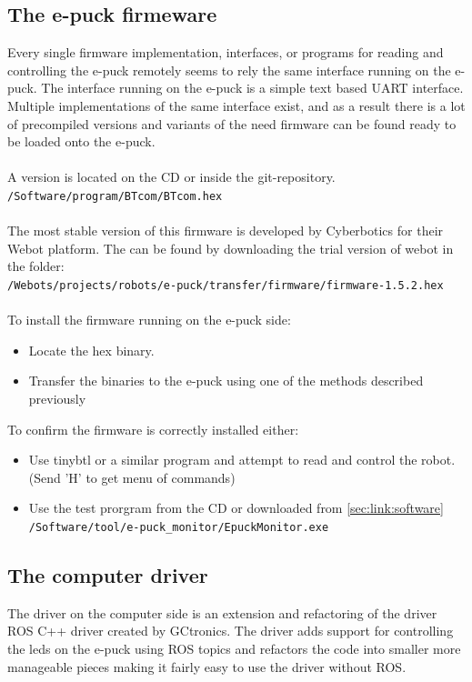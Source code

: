 \documentclass{article}
\newcommand{\stt}[1]{{\small\tt #1}}
\begin{document}
\subsection{The e-puck firmeware}
\label{sec:driver_epuck_side}
Every single firmware implementation, interfaces, or programs for reading and controlling the 
e-puck remotely seems to rely the same interface running on the e-puck.
The interface running on the e-puck is a simple text based UART interface. Multiple implementations of the same interface exist, and as a result there is a lot of precompiled versions and variants of the need firmware can be found ready to be loaded onto the e-puck.
\\
\\A version is located on the CD or inside the git-repository.
\\\stt{/Software/program/BTcom/BTcom.hex}
\\
\\
The most stable version of this firmware is developed by
Cyberbotics for their Webot platform.
The can be found by downloading the trial version of webot in the folder:
\\\stt{/Webots/projects/robots/e-puck/transfer/firmware/firmware-1.5.2.hex}
\\\
\\
\noindent
To install the firmware running on the e-puck side:
\begin{itemize}
\item Locate the hex binary. 
\item Transfer the binaries to the e-puck using one of the methods described previously 
\end{itemize}

\noindent
To confirm the firmware is correctly installed either:
\begin{itemize}
\item Use tinybtl or a similar program and attempt to read and control the robot. (Send 'H' to get menu of commands)
\item Use the test prorgram from the CD or downloaded from \ref{sec:link:software}
\\ \stt{/Software/tool/e-puck\_monitor/EpuckMonitor.exe}
\end{itemize}


\subsection{The computer driver}
The driver on the computer side is an extension and refactoring of the driver ROS C++ driver created by GCtronics.
The driver adds support for controlling the leds on the e-puck using ROS topics and refactors the code
into smaller more manageable pieces making it fairly easy to use the driver without ROS.
\end{document}
